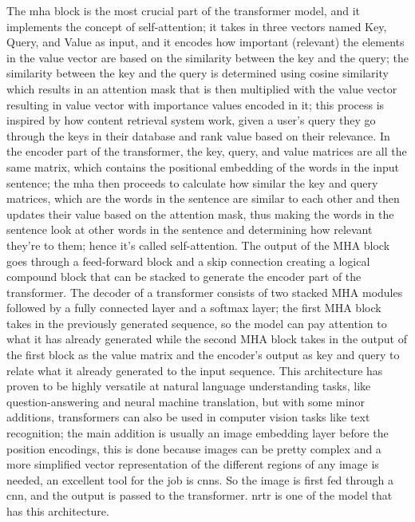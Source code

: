 The \gls{mha} block is the most crucial part of the transformer model, and it implements the concept of self-attention; it takes in three vectors named Key, Query, and Value as input, and it encodes how important (relevant) the elements in the value vector are based on the similarity between the key and the query; the similarity between the key and the query is determined using cosine similarity which results in an attention mask that is then multiplied with the value vector resulting in value vector with importance values encoded in it; this process is inspired by how content retrieval system work, given a user's query they go through the keys in their database and rank value based on their relevance. In the encoder part of the transformer, the key, query, and value matrices are all the same matrix, which contains the positional embedding of the words in the input sentence; the \gls{mha} then proceeds to calculate how similar the key and query matrices, which are the words in the sentence are similar to each other and then updates their value based on the attention mask, thus making the words in the sentence look at other words in the sentence and determining how relevant they're to them; hence it's called self-attention. The output of the MHA block goes through a feed-forward block and a skip connection creating a logical compound block that can be stacked to generate the encoder part of the transformer. The decoder of a transformer consists of two stacked MHA modules followed by a fully connected layer and a softmax layer; the first MHA block takes in the previously generated sequence, so the model can pay attention to what it has already generated while the second MHA block takes in the output of the first block as the value matrix and the encoder's output as key and query to relate what it already generated to the input sequence. This architecture has proven to be highly versatile at natural language understanding tasks, like question-answering and neural machine translation, but with some minor additions, transformers can also be used in computer vision tasks like text recognition; the main addition is usually an image embedding layer before the position encodings, this is done because images can be pretty complex and a more simplified vector representation of the different regions of any image is needed, an excellent tool for the job is \gls{cnn}s. So the image is first fed through a \gls{cnn}, and the output is passed to the transformer. \mbox{\gls{nrtr}} \cite{sheng_nrtr_2019} is one of the model that has this architecture.

